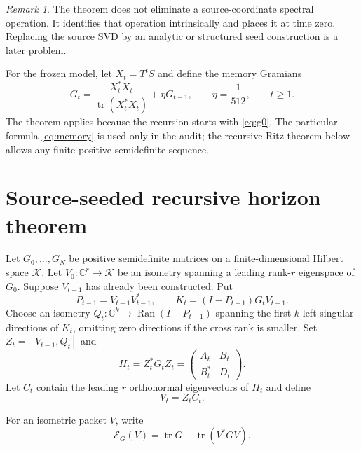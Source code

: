 \documentclass[11pt]{article}
\theoremstyle{definition}
\theoremstyle{remark}
\newtheorem{remark}[theorem]{Remark}
\newcommand{\tr}{\operatorname{tr}}
\newcommand{\Ran}{\operatorname{Ran}}
\newcommand{\E}{\mathcal E}
\begin{document}
\begin{remark}
The theorem does not eliminate a source-coordinate spectral operation.  It
identifies that operation intrinsically and places it at time zero.  Replacing
the source SVD by an analytic or structured seed construction is a later
problem.
\end{remark}

For the frozen model, let $X_t=T^tS$ and define the memory Gramians
\begin{equation}
 G_t=\frac{X_t^*X_t}{\tr(X_t^*X_t)}+\eta G_{t-1},
 \qquad \eta=\frac1{512},
 \qquad t\ge1.
 \label{eq:memory}
\end{equation}
The theorem applies because the recursion starts with \eqref{eq:g0}.  The
particular formula \eqref{eq:memory} is used only in the audit; the recursive
Ritz theorem below allows any finite positive semidefinite sequence.

\section{Source-seeded recursive horizon theorem}
\label{sec:horizon}

Let $G_0,\ldots,G_N$ be positive semidefinite matrices on a finite-dimensional
Hilbert space $\mathcal K$.  Let $V_0:\mathbb C^r\to\mathcal K$ be an
isometry spanning a leading rank-$r$ eigenspace of $G_0$.  Suppose
$V_{t-1}$ has already been constructed.  Put
\begin{equation}
 P_{t-1}=V_{t-1}V_{t-1}^*,
 \qquad
 K_t=(I-P_{t-1})G_tV_{t-1}.
 \label{eq:kt}
\end{equation}
Choose an isometry $Q_t:\mathbb C^k\to\Ran(I-P_{t-1})$ spanning the first
$k$ left singular directions of $K_t$, omitting zero directions if the cross
rank is smaller.  Set $Z_t=[V_{t-1},Q_t]$ and
\begin{equation}
 H_t=Z_t^*G_tZ_t
 =\begin{pmatrix}A_t&B_t\\B_t^*&D_t\end{pmatrix}.
 \label{eq:ht}
\end{equation}
Let $C_t$ contain the leading $r$ orthonormal eigenvectors of $H_t$ and define
\begin{equation}
 V_t=Z_tC_t.
 \label{eq:vt}
\end{equation}

For an isometric packet $V$, write
\[
 \E_G(V)=\tr G-\tr(V^*GV).
\]
\end{document}
